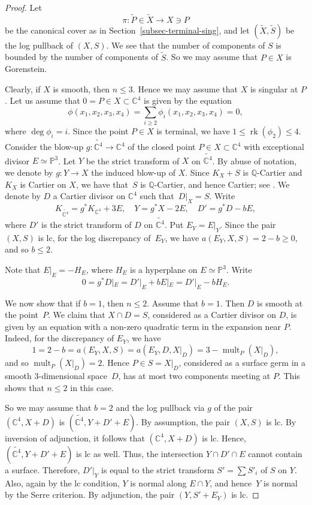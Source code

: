 \documentclass[11pt]{amsart}
\numberwithin{equation}{section}
\theoremstyle{definition}
\theoremstyle{remark}
\newcommand{\lra}{\longrightarrow}
\DeclareMathOperator{\mult}{mult}
\DeclareMathOperator{\rk}{rk}
\begin{document}
\begin{proof}
Let 
\[
\pi\colon \widetilde{P}\in\widetilde{X}\lra X\ni P
\]
be the canonical cover as in Section~\ref{subsec-terminal-sing}, and let $(\widetilde{X}, \widetilde{S})$ be the log pullback of $(X, S)$.
We see that the number of components of $S$ is bounded by the number of components of $\widetilde{S}$.  
So we may assume that $P\in X$ is Gorenstein. 

Clearly, if $X$ is smooth, then $n\leq 3$. 
Hence we may assume that $X$ is singular at $P$. Let us assume that $0=P\in X\subset \mathbb{C}^4$ is given by the equation
\[
\phi(x_1,x_2,x_3,x_4)=\sum_{i\geq 2}\phi_i(x_1,x_2,x_3,x_4)=0, 
\]
where $\deg \phi_i = i$. Since the point $P\in X$ is terminal, we have $1\leq \rk(\phi_2)\leq 4$. Consider the blow-up $g\colon \widetilde{\mathbb{C}^4} \to \mathbb{C}^4$ of the closed point $P\in X\subset \mathbb{C}^4$ with  exceptional divisor $E\simeq \mathbb{P}^3$. 
Let $Y$ be the strict transform of $X$ on $\widetilde{\mathbb{C}^4}$. 
By abuse of notation, we denote by $g\colon Y\to X$ the induced blow-up of $X$. 
Since $K_X+S$ is $\mathbb{Q}$-Cartier and~$K_X$ is Cartier on $X$, we have that~$S$ is $\mathbb{Q}$-Cartier, and hence Cartier; see \cite[Lemma 5.1]{Kaw88}. 
We denote by $D$ a Cartier divisor on $\mathbb{C}^4$ such that~$D|_X=S$. Write
\begin{equation}
K_{\widetilde{\mathbb{C}^4}} = g^* K_{\mathbb{C}^4} + 3 E, \quad 
Y = g^* X - 2 E,\quad 
D' = g^*D - b E, 
\end{equation}
where $D'$ is the strict transform of $D$ on $\widetilde{\mathbb{C}^4}$. Put $E_Y=E|_Y$. 
Since the pair $(X, S)$ is lc, for the log discrepancy of~$E_Y$, we have $a(E_Y, X, S) = 2-b\geq 0$, and so 
$b\leq 2$. 

Note that $E|_E = -H_E$, where $H_E$ is a hyperplane on $E\simeq \mathbb{P}^3$.
Write 
\[
0 = g^*D|_E = D'|_E + bE|_E = D'|_E - b H_E.
\]

We now show that if $b=1$, then $n\leq 2$. 
Assume that $b=1$. Then $D$ is smooth at the point~$P$. We claim that $X\cap D=S$, considered as a Cartier divisor on $D$, is given by an equation with a non-zero quadratic term in the expansion near $P$. Indeed, for the discrepancy of $E_Y$, we have 
\[
1=2-b=a(E_Y, X, S) = a(E_Y, D, X|_D)=3-\mult_P (X|_D),
\]  
and so $\mult_P (X|_D)=2$. 
Hence $P\in S=X|_D$, considered as a surface germ in a smooth $3$-dimensional space~$D$, has at most two components meeting at $P$. This shows that $n\leq 2$ in this case. 

   So we may assume that $b=2$ and the log pullback via $g$ of the pair $(\mathbb{C}^4, X+ D)$ is $(\widetilde{\mathbb{C}^4}, Y+ D'+E)$.
By assumption, the pair $(X, S)$ is lc. By inversion of adjunction, it follows that $(\mathbb{C}^4, X+ D)$ is lc. Hence, $(\widetilde{\mathbb{C}^4}, Y+ D'+E)$ is lc as well. Thus, the intersection $Y\cap D'\cap E$ cannot contain a surface. Therefore, $ D'|_Y$ is equal to the strict transform $S'=\sum S'_i $ of $S$ on $Y$. Also, again by the lc condition, $Y$ is normal along $E\cap Y$, and hence~$Y$ is normal by the Serre criterion.  
By adjunction, the pair $(Y, S'+E_Y)$ is lc.


\end{proof}
\end{document}
